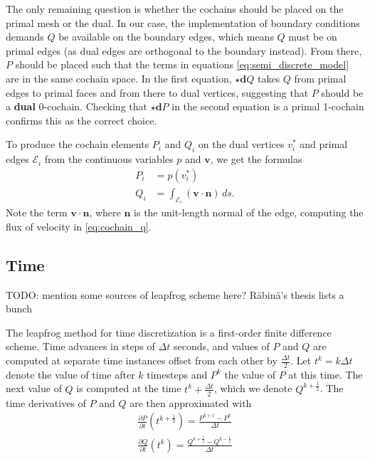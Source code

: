 \documentclass[utf8,english]{gradu3}
\begin{document}
The only remaining question is whether the cochains should be placed
on the primal mesh or the dual.
In our case, the implementation of boundary conditions demands $Q$
be available on the boundary edges, which means $Q$ must be on primal edges
(as dual edges are orthogonal to the boundary instead).
From there, $P$ should be placed such that the terms in equations \eqref{eq:semi_discrete_model}
are in the same cochain space.
In the first equation, $\star\mathbf{d}Q$
takes $Q$ from primal edges to primal faces and from there to dual vertices,
suggesting that $P$ should be a \textbf{dual} 0-cochain.
Checking that $\star \mathbf{d} P$ in the second equation
is a primal 1-cochain confirms this as the correct choice.

To produce the cochain elements $P_i$ and $Q_i$
on the dual vertices $v_i^*$ and primal edges $\mathcal{E}_i$
from the continuous variables $p$ and $\mathbf{v}$,
we get the formulas
\begin{align}
  \label{eq:cochain_p}
  P_i &= p(v_i^*) \\
  \label{eq:cochain_q}
  Q_i &= \int_{\mathcal{E}_i} (\mathbf{v} \cdot \mathbf{n}) \,ds.
\end{align}
Note the term $\mathbf{v} \cdot \mathbf{n}$,
where $\mathbf{n}$ is the unit-length normal of the edge,
computing the flux of velocity in \eqref{eq:cochain_q}.

\subsection{Time}\label{sec:time_discr}

TODO: mention some sources of leapfrog scheme here? Räbinä's thesis lists a bunch

The leapfrog method for time discretization is a first-order finite difference scheme.
Time advances in steps of $\Delta t$ seconds,
and values of $P$ and $Q$ are computed at separate time instances
offset from each other by $\frac{\Delta t}{2}$.
Let $t^k = k\Delta t$ denote the value of time after $k$ timesteps
and $P^k$ the value of $P$ at this time.
The next value of $Q$ is computed at the time $t^k + \frac{\Delta t}{2}$,
which we denote $Q^{k+\frac{1}{2}}$.
The time derivatives of $P$ and $Q$ are then approximated with
\begin{eqnarray}
  \label{eq:time_derivative_p}
  \frac{\partial P}{\partial t}(t^{k+\frac{1}{2}}) = \frac{P^{k+1} - P^k}{\Delta t} \\
  \label{eq:time_derivative_q}
  \frac{\partial Q}{\partial t}(t^k) = \frac{Q^{k+\frac{1}{2}} - Q^{k-\frac{1}{2}}}{\Delta t}
\end{eqnarray}
\end{document}

